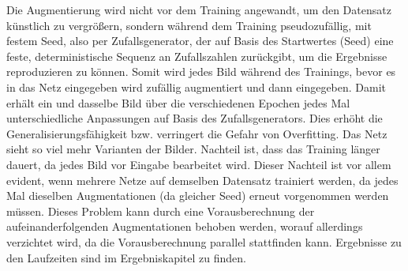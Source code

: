 Die Augmentierung wird nicht vor dem Training angewandt, um den Datensatz künstlich zu vergrößern, 
sondern während dem Training pseudozufällig, mit festem Seed, 
also per Zufallsgenerator, der auf Basis des Startwertes (Seed) eine feste, 
deterministische Sequenz an Zufallszahlen zurückgibt, um die Ergebnisse reproduzieren zu können.
Somit wird jedes Bild während des Trainings, bevor es in das Netz eingegeben wird zufällig augmentiert 
und dann eingegeben. Damit erhält ein und dasselbe Bild über die verschiedenen Epochen jedes Mal unterschiedliche 
Anpassungen auf Basis des Zufallsgenerators. Dies erhöht die Generalisierungsfähigkeit bzw. 
verringert die Gefahr von Overfitting. Das Netz sieht so viel mehr Varianten der Bilder. 
Nachteil ist, dass das Training länger dauert, da jedes Bild vor Eingabe bearbeitet wird. 
Dieser Nachteil ist vor allem evident, wenn mehrere Netze auf demselben Datensatz trainiert werden, da jedes Mal 
dieselben Augmentationen (da gleicher Seed) erneut vorgenommen werden müssen. Dieses Problem kann
durch eine Vorausberechnung der aufeinanderfolgenden Augmentationen behoben werden, worauf allerdings verzichtet wird,
da die Vorausberechnung parallel stattfinden kann. Ergebnisse zu den Laufzeiten sind im Ergebniskapitel zu finden. 

